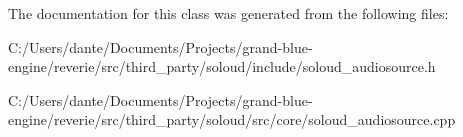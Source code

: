 The documentation for this class was generated from the following files\+:\begin{DoxyCompactItemize}
\item 
C\+:/\+Users/dante/\+Documents/\+Projects/grand-\/blue-\/engine/reverie/src/third\+\_\+party/soloud/include/soloud\+\_\+audiosource.\+h\item 
C\+:/\+Users/dante/\+Documents/\+Projects/grand-\/blue-\/engine/reverie/src/third\+\_\+party/soloud/src/core/soloud\+\_\+audiosource.\+cpp\end{DoxyCompactItemize}
